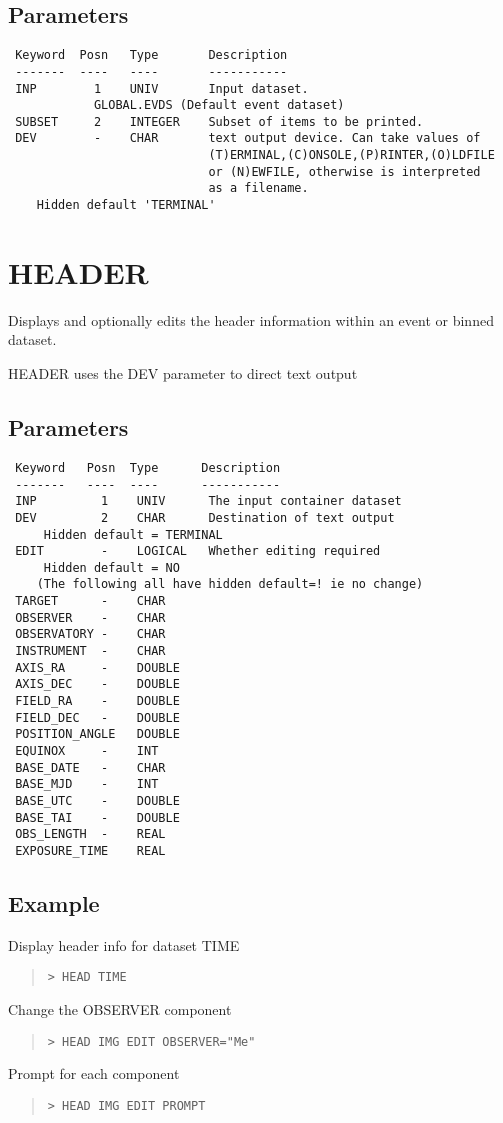 \documentclass{book}
\renewcommand{\_}{{\tt\char'137}}     %
\begin{document}
\subsection{Parameters}
\begin{verbatim}
 Keyword  Posn   Type       Description
 -------  ----   ----       -----------
 INP        1    UNIV       Input dataset.
            GLOBAL.EVDS (Default event dataset)
 SUBSET     2    INTEGER    Subset of items to be printed.
 DEV        -    CHAR       text output device. Can take values of
                            (T)ERMINAL,(C)ONSOLE,(P)RINTER,(O)LDFILE
                            or (N)EWFILE, otherwise is interpreted
                            as a filename.
    Hidden default 'TERMINAL'
\end{verbatim}\section{HEADER}
Displays and optionally edits the header information within
an event or binned dataset.

HEADER uses the DEV parameter to direct text output

\subsection{Parameters}
\begin{verbatim}
 Keyword   Posn  Type      Description
 -------   ----  ----      -----------
 INP         1    UNIV      The input container dataset
 DEV         2    CHAR      Destination of text output
     Hidden default = TERMINAL
 EDIT        -    LOGICAL   Whether editing required
     Hidden default = NO
    (The following all have hidden default=! ie no change)
 TARGET      -    CHAR
 OBSERVER    -    CHAR
 OBSERVATORY -    CHAR
 INSTRUMENT  -    CHAR
 AXIS_RA     -    DOUBLE
 AXIS_DEC    -    DOUBLE
 FIELD_RA    -    DOUBLE
 FIELD_DEC   -    DOUBLE
 POSITION_ANGLE   DOUBLE
 EQUINOX     -    INT
 BASE_DATE   -    CHAR
 BASE_MJD    -    INT
 BASE_UTC    -    DOUBLE
 BASE_TAI    -    DOUBLE
 OBS_LENGTH  -    REAL
 EXPOSURE_TIME    REAL

\end{verbatim}\subsection{Example}
Display header info for dataset TIME
\begin{quote}\begin{verbatim}
> HEAD TIME
\end{verbatim}\end{quote}
Change the OBSERVER component
\begin{quote}\begin{verbatim}
> HEAD IMG EDIT OBSERVER="Me"
\end{verbatim}\end{quote}
Prompt for each component
\begin{quote}\begin{verbatim}
> HEAD IMG EDIT PROMPT
\end{verbatim}\end{quote}
\end{document}
